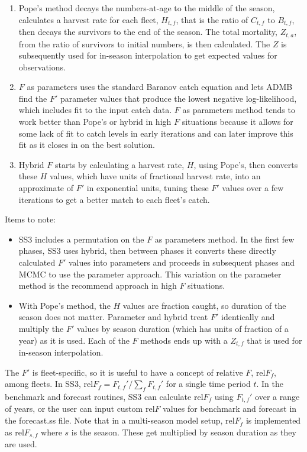\begin{enumerate}
	\item Pope's method decays the numbers-at-age to the middle of the season, calculates a harvest rate for each fleet, $H_{t,f}$, that is the ratio of $C_{t,f}$ to $B_{t,f}$, then decays the survivors to the end of the season. The total mortality, $Z_{t,a}$, from the ratio of survivors to initial numbers, is then calculated. The $Z$ is subsequently used for in-season interpolation to get expected values for observations.
	
	\item $F$ as parameters uses the standard Baranov catch equation and lets ADMB find the $F'$ parameter values that produce the lowest negative log-likelihood, which includes fit to the input catch data. $F$ as parameters method tends to work better than Pope's or hybrid in high $F$ situations because it allows for some lack of fit to catch levels in early iterations and can later improve this fit as it closes in on the best solution.
	
	\item Hybrid $F$ starts by calculating a harvest rate, $H$, using Pope's, then converts these $H$ values, which have units of fractional harvest rate, into an approximate of $F'$ in exponential units, tuning these $F'$ values over a few iterations to get a better match to each fleet's catch.
\end{enumerate}

Items to note:
\begin{itemize}
	\item SS3 includes a permutation on the $F$ as parameters method. In the first few phases, SS3 uses hybrid, then between phases it converts these directly calculated $F'$ values into parameters and proceeds in subsequent phases and MCMC to use the parameter approach. This variation on the parameter method is the recommend approach in high $F$ situations.
	
	\item With Pope's method, the $H$ values are fraction caught, so duration of the season does not matter. Parameter and hybrid treat $F'$ identically and multiply the $F'$ values by season duration (which has units of fraction of a year) as it is used. Each of the $F$ methods ends up with a $Z_{t,f}$ that is used for in-season interpolation.
\end{itemize}

The $F'$ is fleet-specific, so it is useful to have a concept of relative $F$, $\text{rel}F_f$, among fleets. In SS3, $\text{rel}F_f= F_{t,f}'/\sum_{f}^{}F_{t,f}'$ for a single time period $t$. In the benchmark and forecast routines, SS3 can calculate $\text{rel}F_f$ using $F_{t,f}'$ over a range of years, or the user can input custom $\text{rel}F$ values for benchmark and forecast in the forecast.ss file. Note that in a multi-season model setup, $\text{rel}F_f$ is implemented as $\text{rel}F_{s,f}$ where $s$ is the season. These get multiplied by season duration as they are used.


